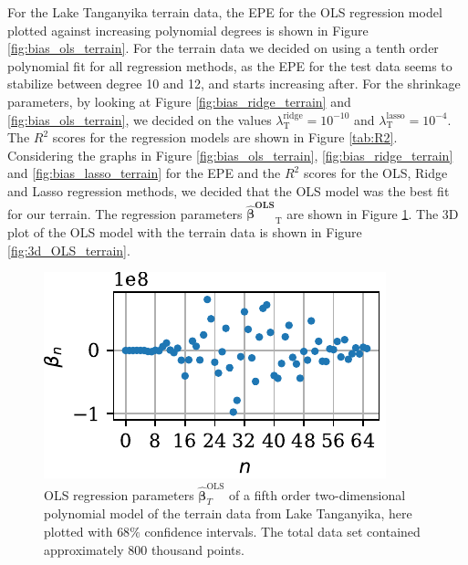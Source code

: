 \documentclass[a4paper, 10pt]{article}
\begin{document}
\begin{multicols}{2}
\noindent
For the Lake Tanganyika  terrain data, the EPE for the OLS regression model plotted against increasing polynomial degrees is shown in Figure \ref{fig:bias_ols_terrain}. For the terrain data we decided on using a tenth order polynomial fit for all regression methods, as the EPE for the test data seems to stabilize between degree 10 and 12, and starts increasing after.  For the shrinkage parameters, by looking at Figure \ref{fig:bias_ridge_terrain} and \ref{fig:bias_ols_terrain}, we decided on the values  $\lambda^\text{ridge}_\text{T}=10^{-10} $ and $\lambda^\text{lasso}_\text{T}=10^{-4} $. 
The $R^2$ scores for the regression models  are shown in Figure \ref{tab:R2}. Considering the graphs in Figure \ref{fig:bias_ols_terrain}, \ref{fig:bias_ridge_terrain} and \ref{fig:bias_lasso_terrain} for the EPE  and the $R^2$ scores for the OLS, Ridge and Lasso regression methods, we decided that the OLS model was the best fit for our terrain.  The regression parameters $\bm{\hat{\beta}^\text{OLS}}_\text{T}$ are shown in Figure \ref{fig:beta_variance_terrain}. The 3D plot of the OLS model with the terrain data is shown in Figure \ref{fig:3d_OLS_terrain}.

\begin{figure}[H]
    \includegraphics[scale=1]{figs/beta_variance_ols_terrain.pdf}
    \caption{OLS regression parameters $\bm{\hat{\beta}}^{\text{OLS}}_T$  of a fifth order two-dimensional polynomial model  of the terrain data from Lake Tanganyika, here plotted with $68\%$ confidence intervals. The total data set contained approximately 800 thousand points.}
    \label{fig:beta_variance_terrain}
\end{figure}

\end{multicols}
\end{document}
